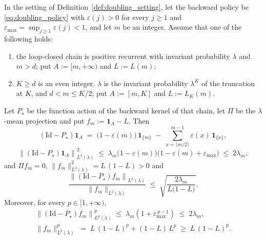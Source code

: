\begin{lemma}\label{lem:doubling_percut}
In the setting of Definition~\ref{def:doubling_setting}, let the backward policy be
\eqref{eq:doubling_policy} with $\varepsilon(j)>0$ for every $j\geq1$ and
$\varepsilon_{\max}=\sup_{j\geq1}\varepsilon(j)<1$, and let $m$ be an integer. Assume that one
of the following holds:
\begin{enumerate}
    \item the loop-closed chain is positive recurrent with invariant probability $\lambda$ and
    $m>d$; put $A:=[m,+\infty)$ and $L:=L(m)$;
    \item $K\geq d$ is an even integer, $\lambda$ is the invariant probability $\lambda^K$ of
    the truncation at $K$, and $d<m\leq K/2$; put $A:=[m,K]$ and $L:=L_K(m)$.
\end{enumerate}
Let $P_\star$ be the function action of the backward kernel of that chain,
let $\Pi$ be the $\lambda$-mean projection and put $f_m:=\mathbf 1_A-L$. Then
\begin{equation}\label{eq:doubling_step1}
    \left(\mathrm{Id}-P_\star\right)\mathbf 1_A
    \;=\;\bigl(1-\varepsilon(m)\bigr)\,\mathbf 1_{\{m\}}
    \;-\;\sum_{x=\lceil m/2\rceil}^{m-1}\varepsilon(x)\,\mathbf 1_{\{x\}} ,
\end{equation}
\begin{equation}\label{eq:doubling_step2}
    \left\|\left(\mathrm{Id}-P_\star\right)\mathbf 1_A\right\|^2_{L^2(\lambda)}
    \;\leq\;\lambda_m\bigl(1-\varepsilon(m)\bigr)\bigl(1-\varepsilon(m)+\varepsilon_{\max}\bigr)
    \;\leq\;2\lambda_m ,
\end{equation}
and $\Pi f_m=0$, $\|f_m\|^2_{L^2(\lambda)}=L\,(1-L)>0$ and
\begin{equation}\label{eq:doubling_step3}
    \frac{\left\|\left(\mathrm{Id}-P_\star\right)f_m\right\|_{L^2(\lambda)}}{\|f_m\|_{L^2(\lambda)}}
    \;\leq\;\sqrt{\frac{2\lambda_m}{L\bigl(1-L\bigr)}} .
\end{equation}
Moreover, for every $p\in[1,+\infty)$,
\begin{equation}\label{eq:doubling_stepp}
\begin{gathered}
    \left\|\left(\mathrm{Id}-P_\star\right)f_m\right\|^p_{L^p(\lambda)}
    \;\leq\;\lambda_m\left(1+\varepsilon_{\max}^{\,p-1}\right)\;\leq\;2\lambda_m,\\
    \|f_m\|^p_{L^p(\lambda)}\;=\;L\,(1-L)^p+(1-L)\,L^p\;\geq\;L\,(1-L)^p .
\end{gathered}
\end{equation}
\end{lemma}


